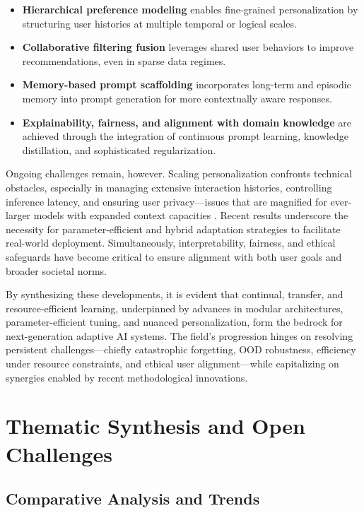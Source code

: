 \begin{itemize}
    \item \textbf{Hierarchical preference modeling} enables fine-grained personalization by structuring user histories at multiple temporal or logical scales.
    \item \textbf{Collaborative filtering fusion} leverages shared user behaviors to improve recommendations, even in sparse data regimes.
    \item \textbf{Memory-based prompt scaffolding} incorporates long-term and episodic memory into prompt generation for more contextually aware responses.
    \item \textbf{Explainability, fairness, and alignment with domain knowledge} are achieved through the integration of continuous prompt learning, knowledge distillation, and sophisticated regularization.
\end{itemize}

Ongoing challenges remain, however. Scaling personalization confronts technical obstacles, especially in managing extensive interaction histories, controlling inference latency, and ensuring user privacy—issues that are magnified for ever-larger models with expanded context capacities \cite{ref5, ref24, ref55}. Recent results underscore the necessity for parameter-efficient and hybrid adaptation strategies to facilitate real-world deployment. Simultaneously, interpretability, fairness, and ethical safeguards have become critical to ensure alignment with both user goals and broader societal norms.

By synthesizing these developments, it is evident that continual, transfer, and resource-efficient learning, underpinned by advances in modular architectures, parameter-efficient tuning, and nuanced personalization, form the bedrock for next-generation adaptive AI systems. The field’s progression hinges on resolving persistent challenges—chiefly catastrophic forgetting, OOD robustness, efficiency under resource constraints, and ethical user alignment—while capitalizing on synergies enabled by recent methodological innovations.

\section{Thematic Synthesis and Open Challenges}

\subsection{Comparative Analysis and Trends}

